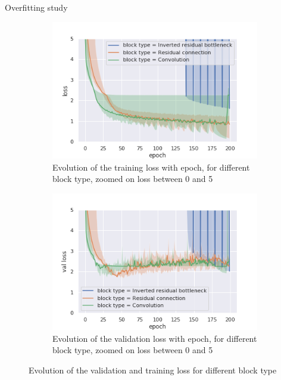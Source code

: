 \documentclass{beamer}
\begin{document}
\begin{frame}{Overfitting study}
    \begin{figure}
  \begin{center}
    \begin{subfigure}[t]{.49\linewidth}
      \centering
      \includegraphics[width=0.99\linewidth]{figures/all_epoch_loss_block_type_zoomed_0_5.png}
      \caption{Evolution of the training loss with epoch, for different block type, zoomed on loss between 0 and 5}
      \label{fig:overfitloss_zoom}
    \end{subfigure}
    \begin{subfigure}[t]{.49\linewidth}
      \centering
      \includegraphics[width=0.99\linewidth]{figures/all_epoch_val_loss_block_type_zoomed_0_5.png}
      \caption{Evolution of the validation loss with epoch, for different block type, zoomed on loss between 0 and 5}
      \label{fig:overfitvalloss_zoom}
    \end{subfigure}
    \caption{Evolution of the validation and training loss for different block type}
  \end{center}
\end{figure}
\end{frame}{}
\end{document}
